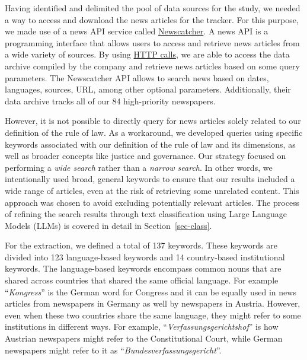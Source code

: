 \documentclass[
]{agujournal2019}
\begin{document}
Having identified and delimited the pool of data sources for the study,
we needed a way to access and download the news articles for the
tracker. For this purpose, we made use of a news API service called
\href{https://www.newscatcherapi.com/}{Newscatcher}. A news API is a
programming interface that allows users to access and retrieve news
articles from a wide variety of sources. By using
\href{https://developer.mozilla.org/en-US/docs/Web/HTTP/Methods}{HTTP
calls}, we are able to access the data archive compiled by the company
and retrieve news articles based on some query parameters. The
Newscatcher API allows to search news based on dates, languages,
sources, URL, among other optional parameters. Additionally, their data
archive tracks all of our 84 high-priority newspapers.

However, it is not possible to directly query for news articles solely
related to our definition of the rule of law. As a workaround, we
developed queries using specific keywords associated with our definition
of the rule of law and its dimensions, as well as broader concepts like
justice and governance. Our strategy focused on performing a \emph{wide
search} rather than a \emph{narrow search}. In other words, we
intentionally used broad, general keywords to ensure that our results
included a wide range of articles, even at the risk of retrieving some
unrelated content. This approach was chosen to avoid excluding
potentially relevant articles. The process of refining the search
results through text classification using Large Language Models (LLMs)
is covered in detail in Section~\ref{sec-class}.

For the extraction, we defined a total of 137 keywords. These keywords
are divided into 123 language-based keywords and 14 country-based
institutional keywords. The language-based keywords encompass common
nouns that are shared across countries that shared the same official
language. For example ``\emph{Kongress}'' is the German word for
Congress and it can be equally used in news articles from newspapers in
Germany as well by newspapers in Austria. However, even when these two
countries share the same language, they might refer to some institutions
in different ways. For example, ``\emph{Verfassungsgerichtshof}'' is how
Austrian newspapers might refer to the Constitutional Court, while
German newspapers might refer to it as
``\emph{Bundesverfassungsgericht}''.
\end{document}
